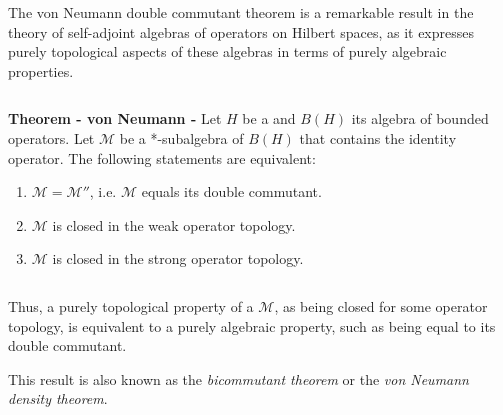 \documentclass[12pt]{article}
\begin{document}
The von Neumann double commutant theorem is a remarkable result in the theory of self-adjoint algebras of operators on Hilbert spaces, as it expresses purely topological aspects of these algebras in terms of purely algebraic properties.

$\,$

{\bf Theorem - von Neumann  -} Let $H$ be a  and $B(H)$ its algebra of bounded operators. Let $\mathcal{M}$ be a *-subalgebra of $B(H)$ that contains the identity operator. The following statements are equivalent:

\begin{enumerate}
\item $\mathcal M = \mathcal M''$, i.e. $\mathcal M$ equals its double commutant.
\item $\mathcal M$ is closed in the weak operator topology.
\item $\mathcal M$ is closed in the strong operator topology.
\end{enumerate}

$\,$

Thus, a purely topological property of a $\mathcal{M}$, as being closed for some operator topology, is equivalent to a purely algebraic property, such as being equal to its double commutant. 

This result is also known as the \emph{bicommutant theorem} or the \emph{von Neumann density theorem}.
\end{document}
